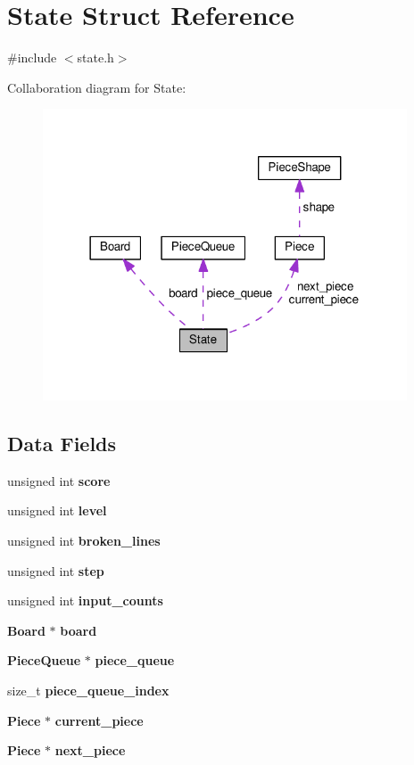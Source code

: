 \section{State Struct Reference}
\label{structState}


{\ttfamily \#include $<$state.\+h$>$}



Collaboration diagram for State\+:
\nopagebreak
\begin{figure}[H]
\begin{center}
\leavevmode
\includegraphics[width=306pt]{structState__coll__graph}
\end{center}
\end{figure}
\subsection*{Data Fields}
\begin{DoxyCompactItemize}
\item 
unsigned int \textbf{ score}
\item 
unsigned int \textbf{ level}
\item 
unsigned int \textbf{ broken\+\_\+lines}
\item 
unsigned int \textbf{ step}
\item 
unsigned int \textbf{ input\+\_\+counts}
\item 
\textbf{ Board} $\ast$ \textbf{ board}
\item 
\textbf{ Piece\+Queue} $\ast$ \textbf{ piece\+\_\+queue}
\item 
size\+\_\+t \textbf{ piece\+\_\+queue\+\_\+index}
\item 
\textbf{ Piece} $\ast$ \textbf{ current\+\_\+piece}
\item 
\textbf{ Piece} $\ast$ \textbf{ next\+\_\+piece}
\end{DoxyCompactItemize}


